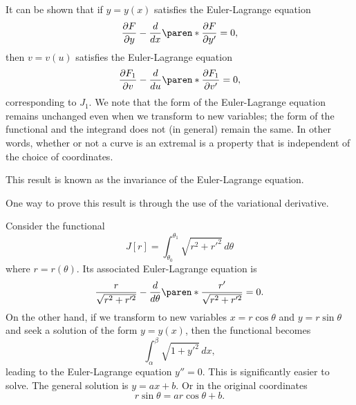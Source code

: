 \documentclass[11pt]{penrose}
\begin{document}
It can be shown that if $y = y(x)$ satisfies the Euler-Lagrange equation
\begin{equation}
    \frac{\pd F}{\pd y} - \frac{d}{dx}\paren*{\frac{\pd F}{\pd y'}} = 0,
\end{equation}
then $v = v(u)$ satisfies the Euler-Lagrange equation
\begin{equation}
    \frac{\pd F_1}{\pd v} - \frac{d}{du}\paren*{\frac{\pd F_1}{\pd v'}} = 0,
\end{equation}
corresponding to $J_1$. We note that the form of the Euler-Lagrange equation remains unchanged even when we transform to new variables; the form of the functional and the integrand does not (in general) remain the same. In other words, whether or not a curve is an extremal is a property that is independent of the choice of coordinates.

This result is known as the invariance of the Euler-Lagrange equation.

One way to prove this result is through the use of the variational derivative.

\begin{negg}
    Consider the functional
    \begin{equation}
        J[r] = \int_{\theta_0}^{\theta_1} \sqrt{r^2 + r'^2} \,d\theta
    \end{equation}
    where $r = r(\theta)$. Its associated Euler-Lagrange equation is
    \begin{equation}
        \frac{r}{\sqrt{r^2 + r'^2}} - \frac{d}{d\theta}\paren*{ \frac{r'}{\sqrt{r^2 + r'^2}} } = 0.
    \end{equation}
    On the other hand, if we transform to new variables $x = r \cos\theta$ and $y = r \sin\theta$ and seek a solution of the form $y = y(x)$, then the functional becomes
    \begin{equation}
        \int_\alpha^\beta \sqrt{1 + y'^2} \,dx,
    \end{equation}
    leading to the Euler-Lagrange equation $y'' = 0$. This is significantly easier to solve. The general solution is $y = a x + b$. Or in the original coordinates
    \begin{equation}
        r \sin\theta = a r \cos\theta + b.
    \end{equation}
\end{negg}
\end{document}
